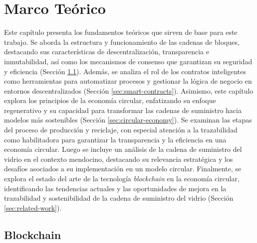 \chapter[Marco Teórico]{Marco Teórico}
\label{cp:theoretical-framework}

\parindent0pt


Este capítulo presenta los fundamentos teóricos que sirven de base para este trabajo. Se aborda la estructura y funcionamiento de las cadenas de bloques, destacando sus características de descentralización, transparencia e inmutabilidad, así como los mecanismos de consenso que garantizan su seguridad y eficiencia (Sección \ref{sec:blockchain}). Además, se analiza el rol de los contratos inteligentes como herramientas para automatizar procesos y gestionar la lógica de negocio en entornos descentralizados (Sección \ref{sec:smart-contracts}). Asimismo, este capítulo explora los principios de la economía circular, enfatizando su enfoque regenerativo y su capacidad para transformar las cadenas de suministro hacia modelos más sostenibles (Sección \ref{sec:circular-economy}). Se examinan las etapas del proceso de producción y reciclaje, con especial atención a la trazabilidad como habilitadora para garantizar la transparencia y la eficiencia en una economía circular. Luego se incluye un análisis de la cadena de suministro del vidrio en el contexto mendocino, destacando su relevancia estratégica y los desafíos asociados a su implementación en un modelo circular. Finalmente, se explora el estado del arte de la tecnología \textit{blockchain} en la economía circular, identificando las tendencias actuales y las oportunidades de mejora en la trazabilidad y sostenibilidad de la cadena de suministro del vidrio (Sección \ref{sec:related-work}).

\section{Blockchain}
\label{sec:blockchain}

